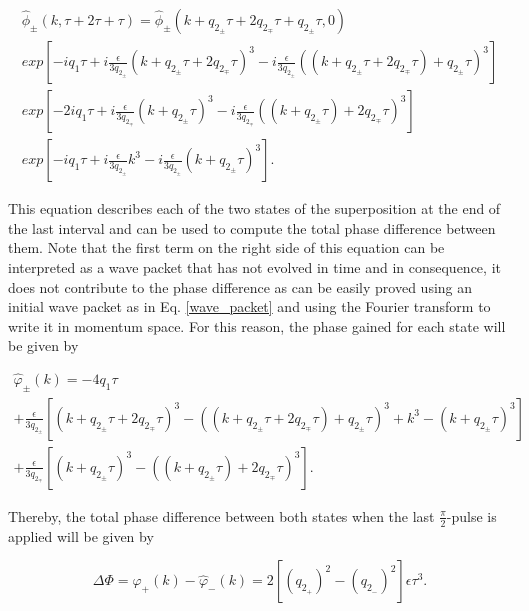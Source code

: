 \documentclass{article}
\begin{document}
\begin{multline}\label{state_t3_momentum_space_final}
\widehat{\phi}_{\pm}(k, \tau+2\tau+\tau) = \widehat{\phi}_{\pm}(k + q_{2_{\pm}}\tau + 2q_{2_{\mp}}\tau + q_{2_{\pm}}\tau , 0) \\ 
exp\left[-i q_{1} \tau + i \frac{\epsilon}{3q_{2_{\pm}}} (k+ q_{2_{\pm}}\tau + 2q_{2_{\mp}}\tau)^{3} - i \frac{\epsilon}{3q_{2_{\pm}}} ((k+q_{2_{\pm}}\tau + 2q_{2_{\mp}}\tau) + q_{2_{\pm}} \tau)^{3} \right] \\
exp\left[-2i q_{1} \tau + i \frac{\epsilon}{3q_{2_{\mp}}} (k+q_{2_{\pm}}\tau)^{3} - i \frac{\epsilon}{3q_{2_{\mp}}} ((k+ q_{2_{\pm}}\tau) + 2q_{2_{\mp}} \tau)^{3} \right] \\
exp\left[-i q_{1} \tau + i \frac{\epsilon}{3q_{2_{\pm}}} k^{3} - i \frac{\epsilon}{3q_{2_{\pm}}} (k + q_{2_{\pm}} \tau)^{3} \right].
\end{multline}

This equation describes each of the two states of the superposition at the end of the last interval and can be used to compute the total phase difference between them. Note that the first term on the right side of this equation can be interpreted as a wave packet that has not evolved in time and in consequence, it does not contribute to the  phase difference as can be easily proved using an initial wave packet as in Eq. \ref{wave_packet} and using the Fourier transform to write it in momentum space. For this reason, the phase gained for each state will be given by

\begin{multline}\label{phase_momentum_space}
\widehat{\varphi}_{\pm}(k) = -4q_{1}\tau \\
+ \frac{\epsilon}{3q_{2_{\pm}}} \left[(k+ q_{2_{\pm}}\tau + 2q_{2_{\mp}}\tau)^{3} - ((k+q_{2_{\pm}}\tau + 2q_{2_{\mp}}\tau) + q_{2_{\pm}} \tau)^{3} + k^{3} - (k+q_{2_{\pm}}\tau)^{3} \right] \\
+ \frac{\epsilon}{3q_{2_{\mp}}} \left[(k+q_{2_{\pm}}\tau)^{3} - ((k+q_{2_{\pm}}\tau)+2q_{2_{\mp}}\tau)^{3} \right].
\end{multline}

Thereby, the total phase difference between both states when the last $\frac{\pi}{2}$-pulse is applied will be given by

\begin{equation}
\Delta \Phi = \widehat{\varphi}_{+}(k) - \widehat{\varphi}_{-}(k) = 2\left[(q_{2_{+}})^{2} - (q_{2_{-}})^{2} \right]\epsilon \tau^{3} .
\end{equation}
\end{document}
